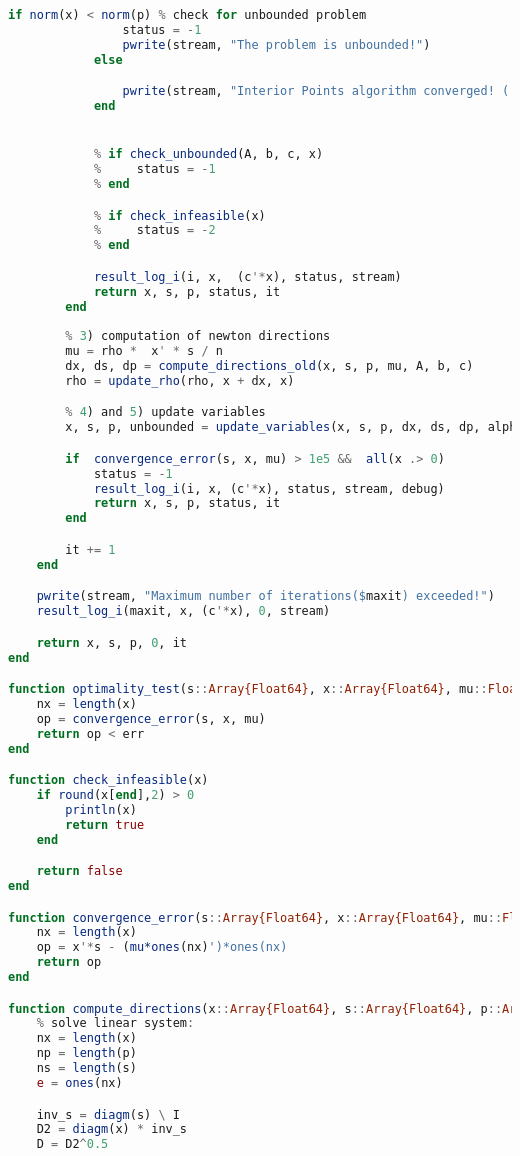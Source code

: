 \documentclass[a4paper]{IEEEtran}
\begin{document}
\begin{lstlisting}[language=Julia,numbers=none]
            if norm(x) < norm(p) % check for unbounded problem
                status = -1
                pwrite(stream, "The problem is unbounded!")
            else

                pwrite(stream, "Interior Points algorithm converged! ( s*x criteria)")
            end


            % if check_unbounded(A, b, c, x)
            %     status = -1
            % end

            % if check_infeasible(x)
            %     status = -2
            % end

            result_log_i(i, x,  (c'*x), status, stream)
            return x, s, p, status, it
        end
        
        % 3) computation of newton directions
        mu = rho *  x' * s / n 
        dx, ds, dp = compute_directions_old(x, s, p, mu, A, b, c)
        rho = update_rho(rho, x + dx, x)

        % 4) and 5) update variables
        x, s, p, unbounded = update_variables(x, s, p, dx, ds, dp, alpha)

        if  convergence_error(s, x, mu) > 1e5 &&  all(x .> 0)
            status = -1
            result_log_i(i, x, (c'*x), status, stream, debug)
            return x, s, p, status, it
        end

        it += 1
    end

    pwrite(stream, "Maximum number of iterations($maxit) exceeded!")
    result_log_i(maxit, x, (c'*x), 0, stream)

    return x, s, p, 0, it
end

function optimality_test(s::Array{Float64}, x::Array{Float64}, mu::Float64, err::Float64)
    nx = length(x)
    op = convergence_error(s, x, mu)
    return op < err
end

function check_infeasible(x)
    if round(x[end],2) > 0
        println(x)
        return true
    end

    return false
end

function convergence_error(s::Array{Float64}, x::Array{Float64}, mu::Float64)
    nx = length(x)
    op = x'*s - (mu*ones(nx)')*ones(nx)
    return op
end

function compute_directions(x::Array{Float64}, s::Array{Float64}, p::Array{Float64}, mu::Float64,  A::Array{Float64}, b::Array{Float64}, c::Array{Float64})
    % solve linear system:
    nx = length(x)
    np = length(p)
    ns = length(s)
    e = ones(nx)

    inv_s = diagm(s) \ I 
    D2 = diagm(x) * inv_s
    D = D2^0.5


\end{lstlisting}
\end{document}
